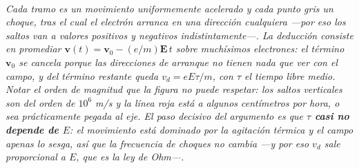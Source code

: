\begin{center}
\\[0.5em]
{\small\itshape Cada tramo es un movimiento uniformemente acelerado y cada punto
gris un choque, tras el cual el electrón arranca en una dirección cualquiera
---por eso los saltos van a valores positivos y negativos indistintamente---. La
deducción consiste en promediar $\mathbf v(t) = \mathbf v_0 - (e/m)\mathbf E\,t$
sobre muchísimos electrones: el término $\mathbf v_0$ se cancela porque las
direcciones de arranque no tienen nada que ver con el campo, y del término
restante queda $v_d = eE\tau/m$, con $\tau$ el tiempo libre medio. Notar el
orden de magnitud que la figura no puede respetar: los saltos verticales son del
orden de $10^{6}$ m/s y la línea roja está a algunos centímetros por hora, o sea
prácticamente pegada al eje. El paso decisivo del argumento es que
\textbf{$\tau$ casi no depende de $E$}: el movimiento está dominado por la
agitación térmica y el campo apenas lo sesga, así que la frecuencia de choques
no cambia ---y por eso $v_d$ sale proporcional a $E$, que es la ley de Ohm---.}
\end{center}
